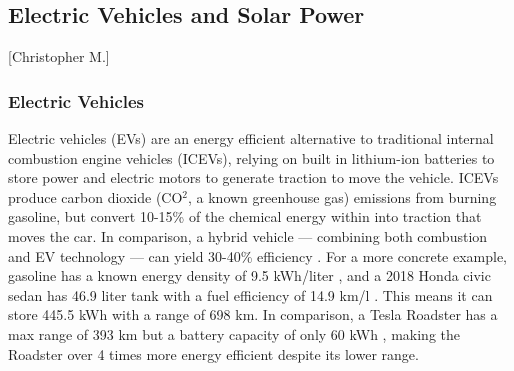 \documentclass{article}                         %
\begin{document}


\subsection{Electric Vehicles and Solar Power}[Christopher M.]
\subsubsection{Electric Vehicles}
Electric vehicles (EVs) are an energy efficient alternative to traditional internal combustion engine vehicles (ICEVs), relying on built in lithium-ion batteries to store power and electric motors to generate traction to move the vehicle. ICEVs produce carbon dioxide (CO$^2$, a known greenhouse gas) emissions from burning gasoline, but convert 10-15\% of the chemical energy within into traction that moves the car. In comparison, a hybrid vehicle --- combining both combustion and EV technology --- can yield 30-40\% efficiency \cite{Zhu2015DistributedGrid}. For a more concrete example, gasoline has a known energy density of 9.5 kWh/liter \cite{EngineeringFactors}, and a 2018 Honda civic sedan has 46.9 liter tank with a fuel efficiency of 14.9 km/l \cite{20182018Information}. This means it can store 445.5 kWh with a range of 698 km. In comparison, a Tesla Roadster has a max range of 393 km but a battery capacity of only 60 kWh \cite{Friel2010ManagementVehicles}, making the Roadster over 4 times more energy efficient despite its lower range.
\end{document}
